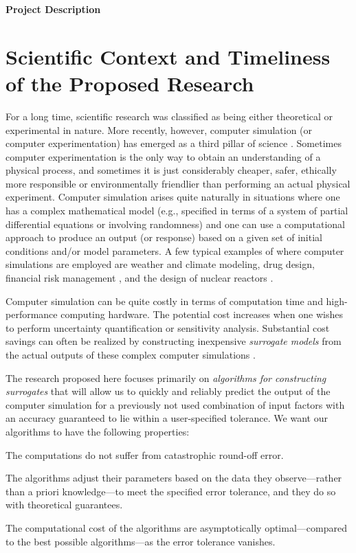 \documentclass[11pt]{NSFamsart}
\begin{document}

\centerline{\Large \bf Project Description}
\section{Scientific Context and Timeliness of the Proposed Research}
For a long time, scientific research was classified as being either theoretical or experimental in nature. More recently, however, computer simulation (or computer experimentation) has emerged as a third pillar of science \citep{PITAC05,OdenGhattas14}. Sometimes computer experimentation is the only way to obtain an understanding of a physical process, and sometimes it is just considerably cheaper, safer, ethically more responsible or environmentally friendlier than performing an actual physical experiment.
Computer simulation arises quite naturally in situations where one has a complex mathematical model (e.g., specified in terms of a system of partial differential equations or involving randomness) and one can use a computational approach to produce an output (or response) based on a given set of initial conditions and/or model parameters. A few typical examples of where computer simulations are employed are weather and climate modeling, drug design, financial risk management \citep{Gla03}, and the design of nuclear reactors \citep[Sect.\ 2.4]{Smi14a}.

Computer simulation can be quite costly in terms of computation time and high-performance computing hardware.  The potential cost increases when one wishes to perform uncertainty quantification or sensitivity analysis.  Substantial cost savings can often be realized by constructing inexpensive \emph{surrogate models} from the actual outputs of these complex computer simulations \citep{FangEtAl06,ForEtal09,SantnerWilliamsNotz03}. 

The research proposed here focuses primarily on \emph{algorithms for constructing surrogates} that will allow us to quickly and reliably predict the output of the computer simulation for a previously not used combination of input factors with an accuracy guaranteed to lie within a user-specified tolerance.  We want our algorithms to have the following properties:
\begin{description}[leftmargin=2.5ex]
\item[Stability] The computations do not suffer from catastrophic round-off error.

\item[Adaptivity] The algorithms adjust their parameters based on the data they observe---rather than a priori knowledge---to meet the specified error tolerance, and they do so with theoretical guarantees.

\item[Efficiency] The computational cost of the algorithms are asymptotically optimal---compared to the best possible algorithms---as the error tolerance vanishes.
\end{description}
\end{document}
